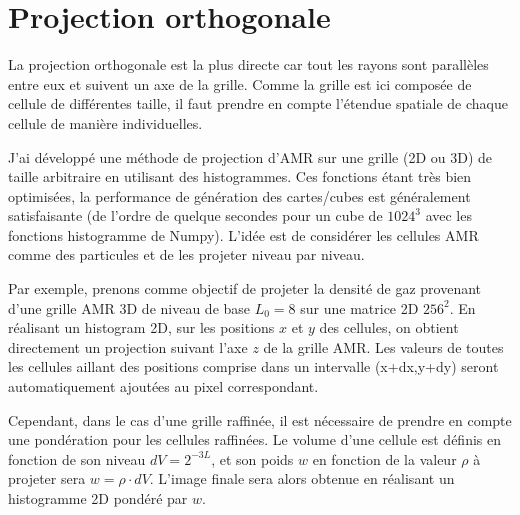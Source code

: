 
\section{Projection orthogonale}

La projection orthogonale est la plus directe car tout les rayons sont parallèles entre eux et suivent un axe de la grille.
Comme la grille est ici composée de cellule de différentes taille, il faut prendre en compte l'étendue spatiale de chaque cellule de manière individuelles.

J'ai développé une méthode de projection d'\ac{AMR} sur une grille (2D ou 3D) de taille arbitraire en utilisant des histogrammes.
Ces fonctions étant très bien optimisées, la performance de génération des cartes/cubes est généralement satisfaisante (de l'ordre de quelque secondes pour un cube de $1024^3$ avec les fonctions histogramme de Numpy).
L'idée est de considérer les cellules \ac{AMR} comme des particules et de les projeter niveau par niveau.



Par exemple, prenons comme objectif de projeter la densité de gaz provenant d'une grille \ac{AMR} 3D de niveau de base $L_{0}=8$ sur une matrice 2D $256^2$.
En réalisant un histogram 2D, sur les positions $x$ et $y$ des cellules, on obtient directement un projection suivant l'axe $z$ de la grille \ac{AMR}.
Les valeurs de toutes les cellules aillant des positions comprise dans un intervalle (x+dx,y+dy) seront automatiquement ajoutées au pixel correspondant.

Cependant, dans le cas d'une grille raffinée, il est nécessaire de prendre en compte une pondération pour les cellules raffinées.
Le volume d'une cellule est définis en fonction de son niveau $dV= 2^{-3L}$, et son poids $w$ en fonction de la valeur $\rho$ à projeter sera $w = \rho \cdot dV$.
L'image finale sera alors obtenue en réalisant un histogramme 2D pondéré par $w$.



